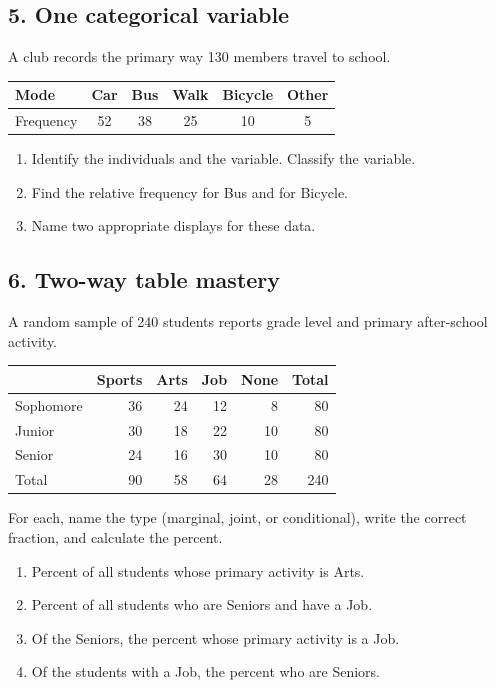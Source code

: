 \documentclass[11pt]{article}
\begin{document}
\subsection*{5. One categorical variable}
A club records the primary way 130 members travel to school.
\begin{center}
\begin{tabular}{lccccc}
Mode & Car & Bus & Walk & Bicycle & Other\\ \hline
Frequency & 52 & 38 & 25 & 10 & 5
\end{tabular}
\end{center}
\begin{enumerate}[label=\alph*.]
  \item Identify the individuals and the variable. Classify the variable.\\[0.22in]
  \item Find the relative frequency for Bus and for Bicycle.\\[0.3in]
  \item Name two appropriate displays for these data.\\[0.2in]
\end{enumerate}

\subsection*{6. Two-way table mastery}
A random sample of 240 students reports grade level and primary after-school activity.
\begin{center}
\begin{tabular}{l|rrrr|r}
 & Sports & Arts & Job & None & Total\\ \hline
Sophomore & 36 & 24 & 12 & 8 & 80\\
Junior & 30 & 18 & 22 & 10 & 80\\
Senior & 24 & 16 & 30 & 10 & 80\\ \hline
Total & 90 & 58 & 64 & 28 & 240
\end{tabular}
\end{center}
For each, name the type (marginal, joint, or conditional), write the correct fraction, and calculate the percent.
\begin{enumerate}[label=\alph*.]
  \item Percent of all students whose primary activity is Arts.\\[0.28in]
  \item Percent of all students who are Seniors and have a Job.\\[0.28in]
  \item Of the Seniors, the percent whose primary activity is a Job.\\[0.28in]
  \item Of the students with a Job, the percent who are Seniors.\\[0.28in]
\end{enumerate}
\end{document}
